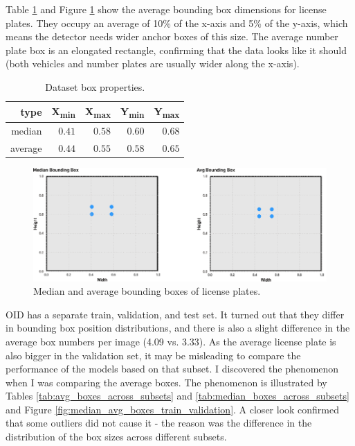 Table \ref{tab:dataset_box_properties} and Figure \ref{fig:median_avg_boxes_plates} show the average bounding box dimensions for license plates. They occupy an average of 10\% of the x-axis and 5\% of the y-axis, which means the detector needs wider anchor boxes of this size. The average number plate box is an elongated rectangle, confirming that the data looks like it should (both vehicles and number plates are usually wider along the x-axis).

\begin{table}[H]
\caption{Dataset box properties.}
\label{tab:dataset_box_properties}
\noindent
\centering
\begin{tabular*}
{\columnwidth}{@{\extracolsep{\stretch{1}}}*{5}{r}@{}}
    type & X\textsubscript{min} & X\textsubscript{max} & Y\textsubscript{min} & Y\textsubscript{max}\\ \hline
    median & $0.41$ & $0.58$ & $0.60$ & $0.68$ \\
    average & $0.44$ & $0.55$ & $0.58$ & $0.65$ \\
\end{tabular*}
\end{table}

\begin{figure}[H]
 \centerline{\includegraphics[width=1.0\columnwidth]{.//Figure/PlateLocalization/median_avg_boxes_plates.png}}
 \caption{Median and average bounding boxes of license plates.}
 \label{fig:median_avg_boxes_plates}
\end{figure}

OID has a separate train, validation, and test set. It turned out that they differ in bounding box position distributions, and there is also a slight difference in the average box numbers per image (4.09 vs. 3.33). As the average license plate is also bigger in the validation set, it may be misleading to compare the performance of the models based on that subset. I discovered the phenomenon when I was comparing the average boxes. The phenomenon is illustrated by Tables \ref{tab:avg_boxes_across_subsets} and \ref{tab:median_boxes_across_subsets} and Figure \ref{fig:median_avg_boxes_train_validation}. A closer look confirmed that some outliers did not cause it - the reason was the difference in the distribution of the box sizes across different subsets.

